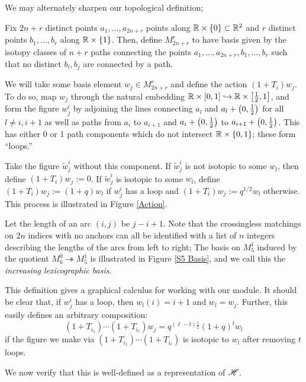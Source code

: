 \documentclass{amsart}
\begin{document}
We may alternately sharpen our topological definition;
\begin{definition}
Fix $2n + r$ distinct points $a_1,\dots,a_{2n + r}$ points along $\mathbb{R} \times \left\{ 0 \right\} \subset \mathbb{R}^2$ and $r$ distinct points $b_1,\dots,b_r$ along $\mathbb{R} \times \left\{ 1 \right\}$.
Then, define $M_{2n + r}^r$ to have basis given by the isotopy classes of $n + r$ paths connecting the points $a_1,\dots,a_{2n+r},b_1,\dots,b_r$ such that no distinct $b_i,b_j$ are connected by a path. 

We will take some basis element $w_j \in M_{2n +r}^r$ and define the action $(1 + T_i)w_j$.
To do so, map $w_j$ through the natural embedding $\mathbb{R} \times \left[ 0,1 \right] \hookrightarrow \mathbb{R} \times \left[ \frac{1}{2},1 \right]$, and form the figure $w_j^i$ by adjoining the lines connecting $a_l$ and $a_l + \left( 0,\frac{1}{2} \right)$ for all $l \neq i,i+1$ as well as paths from $a_i$ to $a_{i+1}$ and $a_i + \left( 0,\frac{1}{2} \right)$ to $a_{i+1} + \left( 0,\frac{1}{2} \right)$.
This has either 0 or 1 path components which do not intersect $\mathbb{R} \times \left\{ 0,1 \right\}$;
these form ``loops.''

Take the figure $\tilde w_j^i$ without this component.
If $\tilde w_j^i$ is not isotopic to some $w_l$, then define $(1 + T_i)w_j := 0$.
If $\tilde w_j^i$ is isotopic to some $w_l$, define $(1 + T_i)w_j := (1 + q)w_l$ if $w_j^i$ has a loop and $(1 + T_i)w_j := q^{1/2}w_l$ otherwise.
This process is illustrated in Figure \ref{Action}.
\end{definition}
  
Let the length of an arc $(i,j)$ be $j - i + 1$.
Note that the crossingless matchings on $2n$ indices with no anchors can all be identified with a list of $n$ integers describing the lengths of the arcs from left to right;
The basis on $M_5^1$ induced by the quotient $M_6^0 \twoheadrightarrow M_{5}^1$ is illustrated in Figure \ref{S5 Basis}, and we call this the \emph{increasing lexicographic basis}. 

\begin{remark}
  This definition gives a graphical calculus for working with our module.
  It should be clear that, if $w_j^i$ has a loop, then $w_l(i) = i+1$ and $w_l = w_j$.
  Further, this easily defines an arbitrary composition:
  \[
    (1 + T_{i_1})\cdots(1 + T_{i_\ell})w_j = q^{(\ell - t)\frac{1}{2}}(1 + q)^tw_l
  \]
  if the figure we make via $(1+T_{i_1})\cdots(1+T_{i_\ell})$ is isotopic to $w_l$ after removing $t$ loops.
\end{remark}

We now verify that this is well-defined as a representation of $\mathscr{H}$.
\end{document}
